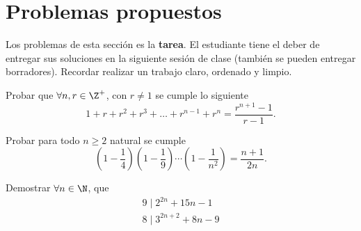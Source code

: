 \section{Problemas propuestos}

Los problemas de esta sección es la \textbf{tarea}.
El estudiante tiene el deber de entregar sus soluciones en la siguiente sesión de clase (también se pueden entregar borradores).
Recordar realizar un trabajo claro, ordenado y limpio.

\begin{problem}
    Probar que $\forall n, r \in \Z^+$, con $r \neq 1$ se cumple lo siguiente
    \[1 + r + r^2 + r^3 + \dots + r^{n-1} + r^n = \frac{r^{n + 1} - 1}{r - 1}.\]
\end{problem}

\begin{problem}
    Probar para todo $n\geq 2$ natural se cumple
    \[\left(1 - \frac{1}{4}\right) \left(1 - \frac{1}{9}\right) \cdots \left(1 - \frac{1}{n^2}\right) = \frac{n + 1}{2n}.\]
\end{problem}

\begin{problem}
    Demostrar $\forall n \in \N$, que
    \begin{gather*}
        9 \mid 2^{2n} + 15n - 1 \\
        8 \mid 3^{2n + 2} + 8n - 9
    \end{gather*}
\end{problem}
